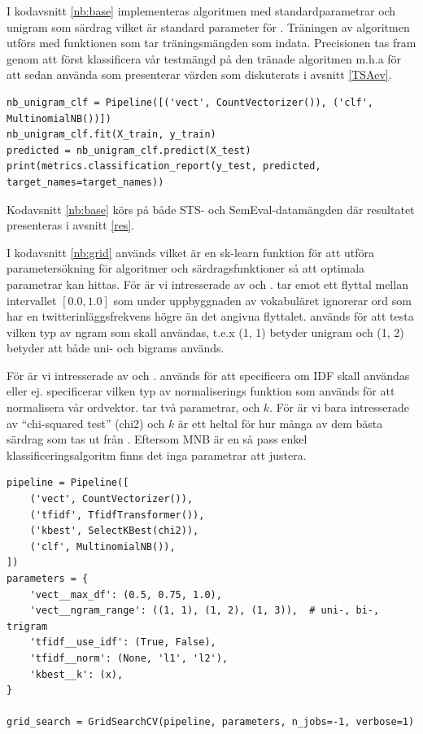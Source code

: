 \documentclass{kaumasters} %
\begin{document}
I kodavsnitt \ref{nb:base} implementeras algoritmen  med standardparametrar \cite{scikit:004} och unigram som särdrag vilket är standard parameter för  \cite{scikit:005}. Träningen av algoritmen utförs med  funktionen som tar träningsmängden som indata. Precisionen tas fram genom att först klassificera vår testmängd på den tränade algoritmen m.h.a  för att sedan använda  som presenterar värden som diskuterats i avsnitt \ref{TSAev}.
\begin{lstlisting}[style=mypython,caption={Kod för att skapa och träna NB-klassificeraren.},label=nb:base]
nb_unigram_clf = Pipeline([('vect', CountVectorizer()), ('clf', MultinomialNB())])
nb_unigram_clf.fit(X_train, y_train)
predicted = nb_unigram_clf.predict(X_test)
print(metrics.classification_report(y_test, predicted, target_names=target_names))
\end{lstlisting}
Kodavsnitt \ref{nb:base} körs på både STS- och SemEval-datamängden där resultatet presenteras i avsnitt \ref{res}.

I kodavsnitt \ref{nb:grid} används  \cite{scikit:006} vilket är en sk-learn funktion för att utföra parametersökning för algoritmer och särdragsfunktioner så att optimala parametrar kan hittas. För  är vi intresserade av  och .  tar emot ett flyttal mellan intervallet $[0.0, 1.0]$ som under uppbyggnaden av vokabuläret ignorerar ord som har en twitterinläggsfrekvens högre än det angivna flyttalet.  används för att testa vilken typ av ngram som skall användas, t.e.x (1, 1) betyder unigram och (1, 2) betyder att både uni- och bigrams används.

För  är vi intresserade av  och .  används för att specificera om IDF skall användas eller ej.  specificerar vilken typ av normaliserings funktion som används för att normalisera vår ordvektor.  \cite{scikit:007} tar två parametrar,  och $k$. För  är vi bara intresserade av “chi-squared test” (chi2) och $k$ är ett heltal för hur många av dem  bästa särdrag som tas ut från . Eftersom MNB är en så pass enkel klassificeringsalgoritm finns det inga parametrar att justera.

\begin{lstlisting}[style=mypython,caption={Kod som används till parametersökning för NB.},label=nb:grid]
pipeline = Pipeline([
    ('vect', CountVectorizer()),
    ('tfidf', TfidfTransformer()),
    ('kbest', SelectKBest(chi2)),
    ('clf', MultinomialNB()),
])
parameters = {
    'vect__max_df': (0.5, 0.75, 1.0),
    'vect__ngram_range': ((1, 1), (1, 2), (1, 3)),  # uni-, bi-, trigram
    'tfidf__use_idf': (True, False),
    'tfidf__norm': (None, 'l1', 'l2'),
    'kbest__k': (x),
}

grid_search = GridSearchCV(pipeline, parameters, n_jobs=-1, verbose=1)
\end{lstlisting}
\end{document}
